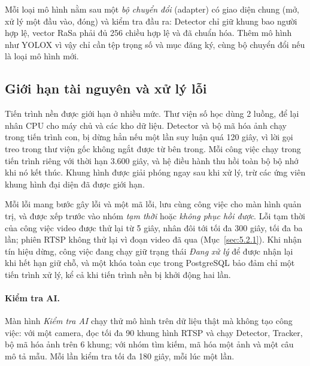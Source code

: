 Mỗi loại mô hình nằm sau một \emph{bộ chuyển đổi} (adapter) có giao diện chung (mở, xử lý một đầu vào, đóng) và kiểm tra đầu ra: Detector chỉ giữ khung bao người hợp lệ, vector RaSa phải đủ 256 chiều hợp lệ và đã chuẩn hóa. Thêm mô hình như YOLOX vì vậy chỉ cần tệp trọng số và mục đăng ký, cùng bộ chuyển đổi nếu là loại mô hình mới.

\subsection{Giới hạn tài nguyên và xử lý lỗi}
\label{sec:6.2.2}

Tiến trình nền được giới hạn ở nhiều mức. Thư viện số học dùng 2 luồng, để lại nhân CPU cho máy chủ và các kho dữ liệu. Detector và bộ mã hóa ảnh chạy trong tiến trình con, bị dừng hẳn nếu một lần suy luận quá 120 giây, vì lời gọi treo trong thư viện gốc không ngắt được từ bên trong. Mỗi công việc chạy trong tiến trình riêng với thời hạn 3.600 giây, và hệ điều hành thu hồi toàn bộ bộ nhớ khi nó kết thúc. Khung hình được giải phóng ngay sau khi xử lý, trừ các ứng viên khung hình đại diện đã được giới hạn.

Mỗi lỗi mang bước gây lỗi và một mã lỗi, lưu cùng công việc cho màn hình quản trị, và được xếp trước vào nhóm \emph{tạm thời} hoặc \emph{không phục hồi được}. Lỗi tạm thời của công việc video được thử lại từ 5 giây, nhân đôi tới tối đa 300 giây, tối đa ba lần; phiên RTSP không thử lại vì đoạn video đã qua (Mục~\ref{sec:5.2.1}). Khi nhận tín hiệu dừng, công việc đang chạy giữ trạng thái \emph{Đang xử lý} để được nhận lại khi hết hạn giữ chỗ, và một khóa toàn cục trong PostgreSQL bảo đảm chỉ một tiến trình xử lý, kể cả khi tiến trình nền bị khởi động hai lần.

\paragraph{Kiểm tra AI.}\label{sec:6.2.5} Màn hình \emph{Kiểm tra AI} chạy thử mô hình trên dữ liệu thật mà không tạo công việc: với một camera, đọc tối đa 90 khung hình RTSP và chạy Detector, Tracker, bộ mã hóa ảnh trên 6 khung; với nhóm tìm kiếm, mã hóa một ảnh và một câu mô tả mẫu. Mỗi lần kiểm tra tối đa 180 giây, mỗi lúc một lần.
